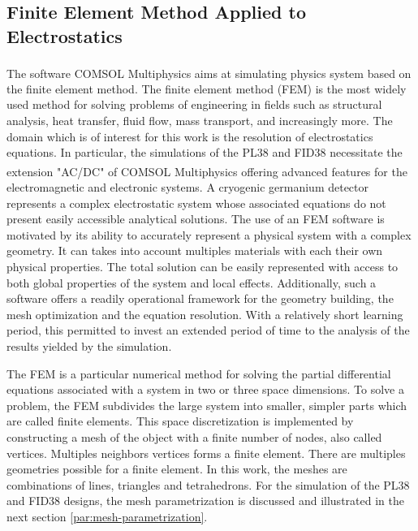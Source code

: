 \subsection{Finite Element Method Applied to Electrostatics}

The software COMSOL\textsuperscript{\textregistered} Multiphysics aims at simulating physics system based on the finite element method. 
The finite element method (FEM) is the most widely used method for solving problems of engineering in fields such as structural analysis, heat transfer, fluid flow, mass transport, and increasingly more. The domain which is of interest for this work is the resolution of electrostatics equations. In particular, the simulations of the PL38 and FID38 necessitate the extension "AC/DC" of COMSOL\textsuperscript{\textregistered} Multiphysics offering advanced features for the electromagnetic and electronic systems.
A cryogenic germanium detector represents a complex electrostatic system whose associated equations do not present easily accessible analytical solutions. The use of an FEM software is motivated by its ability to accurately represent a physical system with a complex geometry. It can takes into account multiples materials with each their own physical properties. The total solution can be easily represented with access to both global properties of the system and local effects. Additionally, such a software offers a readily operational framework for the geometry building, the mesh optimization and the equation resolution. With a relatively short learning period, this permitted to invest an extended period of time to the analysis of the results yielded by the simulation. 

The FEM is a particular numerical method for solving the partial differential equations associated with a system in two or three space dimensions. 
To solve a problem, the FEM subdivides the large system into smaller, simpler parts which are called finite elements. This space discretization is implemented by constructing a mesh of the object with a finite number of nodes, also called vertices. Multiples neighbors vertices forms a finite element. There are multiples geometries possible for a finite element. In this work, the meshes are combinations of lines, triangles and tetrahedrons. For the simulation of the PL38 and FID38 designs, the mesh parametrization is discussed and illustrated in the next section \ref{par:mesh-parametrization}.


